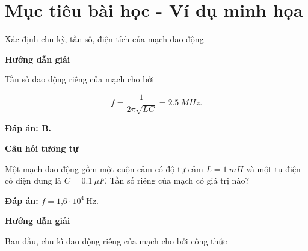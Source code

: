 \section{Mục tiêu bài học - Ví dụ minh họa}
\begin{dang}{Xác định chu kỳ, tần số, điện tích của mạch dao động}
	{	\begin{center}
			\textbf{Hướng dẫn giải}
		\end{center}
		
		
		Tần số dao động riêng của mạch cho bởi
		
		$$f = \dfrac{1}{2\pi \sqrt{LC}} = \SI{2,5}{MHz}.$$
		
		\textbf{Đáp án: B.}
		
		
		\begin{center}
			\textbf{Câu hỏi tương tự}
		\end{center}
		
		Một mạch dao động gồm một cuộn cảm có độ tự cảm $L = \SI{1}{mH}$ và một tụ điện có điện dung là $C = \SI{0,1}{\mu F}$. Tần số riêng của mạch có giá trị nào?
		
		\textbf{Đáp án:} $f = \text{1,6}\cdot 10^4\ \text{Hz}$.
	}
	{	\begin{center}
			\textbf{Hướng dẫn giải}
		\end{center}
		
		Ban đầu, chu kì dao động riêng của mạch cho bởi công thức 
		
}
\end{dang}
